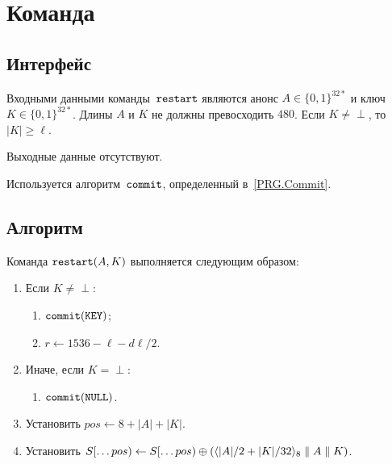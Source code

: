 \section{Команда }\label{PRG.Restart}

\subsection{Интерфейс}\label{PRG.Restart.IFace}

Входными данными команды~$\texttt{restart}$ являются анонс $A\in\{0,1\}^{32*}$ 
и ключ $K\in\{0,1\}^{32*}$. Длины $A$ и $K$ не должны превосходить $480$.
Если $K\neq\perp$, то~$|K|\geq\ell$.

Выходные данные отсутствуют.

Используется алгоритм~$\texttt{commit}$, определенный в~\ref{PRG.Commit}.

\subsection{Алгоритм}\label{PRG.Restart.Alg}

Команда $\texttt{restart}(A,K)$ выполняется следующим образом:
\begin{enumerate}
\item
Если $K\neq\perp$:
\begin{enumerate}
\item
$\texttt{commit}(\texttt{KEY})$;
\item
$r\leftarrow 1536-\ell-d\ell/2$.
\end{enumerate}
\item
Иначе, если $K=\perp$:
\begin{enumerate}
\item
$\texttt{commit}(\texttt{NULL})$.
\end{enumerate}
\item
Установить
$pos\leftarrow 8+|A|+|K|$.
\item
Установить
$S[\dots pos)\leftarrow S[\dots pos)\oplus
\left(\langle|A|/2+|K|/32\rangle_8\parallel A\parallel K\right)$.
\end{enumerate}


